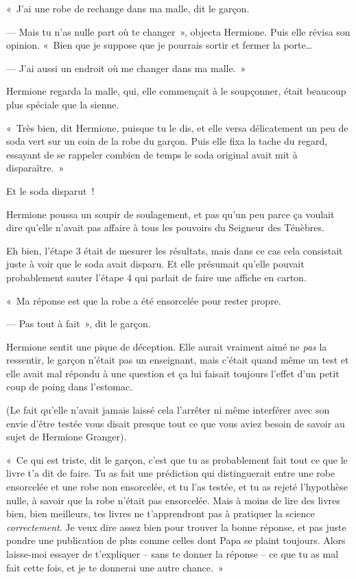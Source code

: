 «~J'ai une robe de rechange dans ma malle, dit le garçon.

--- Mais tu n'as nulle part où te changer~», objecta Hermione. Puis elle révisa son opinion. «~Bien que je suppose que je pourrais sortir et fermer la porte…

--- J'ai aussi un endroit où me changer dans ma malle.~»

Hermione regarda la malle, qui, elle commençait à le soupçonner, était beaucoup plus spéciale que la sienne.

«~Très bien, dit Hermione, puisque tu le dis, et elle versa délicatement un peu de soda vert sur un coin de la robe du garçon. Puis elle fixa la tache du regard, essayant de se rappeler combien de temps le soda original avait mit à disparaître.~»

Et le soda disparut~!

Hermione poussa un soupir de soulagement, et pas qu'un peu parce ça voulait dire qu'elle n'avait pas affaire à tous les pouvoirs du Seigneur des Ténèbres.

Eh bien, l'étape 3 était de mesurer les résultats, mais dans ce cas cela consistait juste à voir que le soda avait disparu. Et elle présumait qu'elle pouvait probablement sauter l'étape 4 qui parlait de faire une affiche en carton.

«~Ma réponse est que la robe a été ensorcelée pour rester propre.

--- Pas tout à fait~», dit le garçon.

Hermione sentit une pique de déception. Elle aurait vraiment aimé ne \emph{pas} la ressentir, le garçon n'était pas un enseignant, mais c'était quand même un test et elle avait mal répondu à une question et ça lui faisait toujours l'effet d'un petit coup de poing dans l'estomac.

(Le fait qu'elle n'avait jamais laissé cela l'arrêter ni même interférer avec son envie d'être testée vous disait presque tout ce que vous aviez besoin de savoir au sujet de Hermione Granger).

«~Ce qui est triste, dit le garçon, c'est que tu as probablement fait tout ce que le livre t'a dit de faire. Tu as fait une prédiction qui distinguerait entre une robe ensorcelée et une robe non ensorcelée, et tu l'as testée, et tu as rejeté l'hypothèse nulle, à savoir que la robe n'était pas ensorcelée. Mais à moins de lire des livres bien, bien meilleurs, tes livres ne t'apprendront pas à pratiquer la science \emph{correctement}. Je veux dire assez bien pour trouver la bonne réponse, et pas juste pondre une publication de plus comme celles dont Papa se plaint toujours. Alors laisse-moi essayer de t'expliquer -- sans te donner la réponse -- ce que tu as mal fait cette fois, et je te donnerai une autre chance.~»

